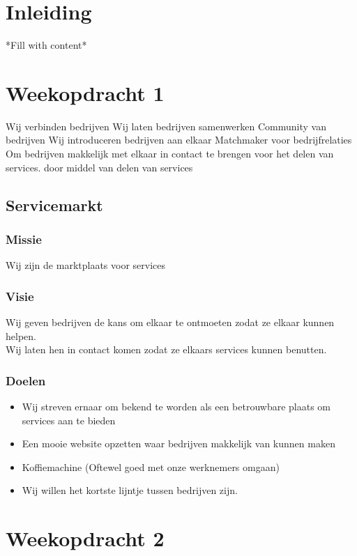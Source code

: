 \documentclass[11pt,oneside,a4paper,numbers=enddot]{report} %
\begin{document}
\Pre

\chapter{Inleiding}
*Fill with content*

\chapter{Weekopdracht 1}

Wij verbinden bedrijven
Wij laten bedrijven samenwerken
Community van bedrijven
Wij introduceren bedrijven aan elkaar
Matchmaker voor bedrijfrelaties
Om bedrijven makkelijk met elkaar in contact te brengen voor het delen van services.
door middel van delen van services

\section{Servicemarkt}

\subsection{Missie}
Wij zijn de marktplaats voor services


\subsection{Visie}
Wij geven bedrijven de kans om elkaar te ontmoeten zodat ze elkaar kunnen helpen. \\
Wij laten hen in contact komen zodat ze elkaars services kunnen benutten.

\subsection{Doelen}

\begin{itemize}
\item
  Wij streven ernaar om bekend te worden als
  een betrouwbare plaats om services aan te bieden
\item
  Een mooie website opzetten waar bedrijven makkelijk van kunnen maken
\item
  Koffiemachine (Oftewel goed met onze werknemers omgaan)
\item
  Wij willen het kortste lijntje tussen bedrijven zijn.
\end{itemize}

\chapter{Weekopdracht 2}
\end{document}

